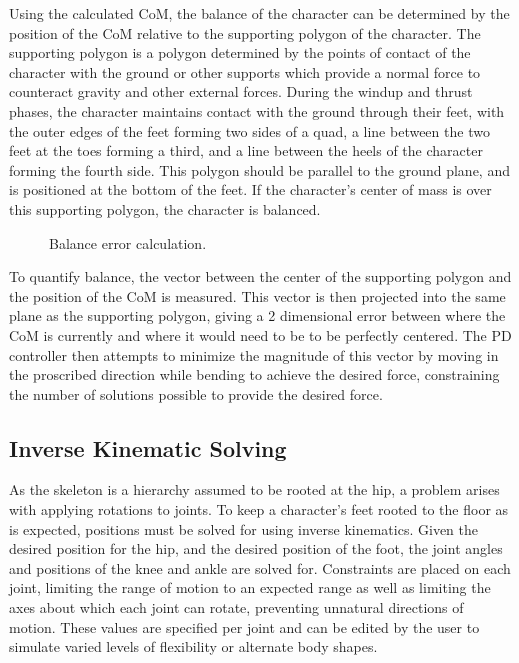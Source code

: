 Using the calculated CoM, the balance of the character can be determined by the position of the CoM relative to the supporting polygon of the character.  The supporting polygon is a polygon determined by the points of contact of the character with the ground or other supports which provide a normal force to counteract gravity and other external forces.  During the windup and thrust phases, the character maintains contact with the ground through their feet, with the outer edges of the feet forming two sides of a quad, a line between the two feet at the toes forming a third, and a line between the heels of the character forming the fourth side.  This polygon should be parallel to the ground plane, and is positioned at the bottom of the feet.  If the character's center of mass is over this supporting polygon, the character is balanced.

\begin{figure}[ht]
	\centering
	\caption[Algorithm diagram for calculation of balance error]{Balance error calculation.}
	\label{fig:balanceErr}
\end{figure}

To quantify balance, the vector between the center of the supporting polygon and the position of the CoM is measured.  This vector is then projected into the same plane as the supporting polygon, giving a 2 dimensional error between where the CoM is currently and where it would need to be to be perfectly centered.  The PD controller then attempts to minimize the magnitude of this vector by moving in the proscribed direction while bending to achieve the desired force, constraining the number of solutions possible to provide the desired force.

\subsection{Inverse Kinematic Solving}
As the skeleton is a hierarchy assumed to be rooted at the hip, a problem arises with applying rotations to joints.  To keep a character's feet rooted to the floor as is expected, positions must be solved for using inverse kinematics.  Given the desired position for the hip, and the desired position of the foot, the joint angles and positions of the knee and ankle are solved for.  Constraints are placed on each joint, limiting the range of motion to an expected range as well as limiting the axes about which each joint can rotate, preventing unnatural directions of motion.  These values are specified per joint and can be edited by the user to simulate varied levels of flexibility or alternate body shapes.

